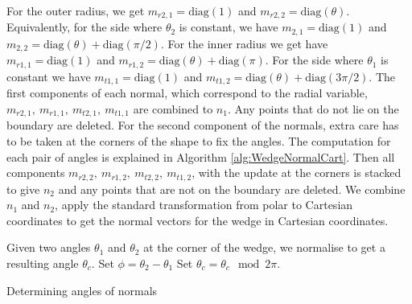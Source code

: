 \documentclass[11pt, a4paper]{article}
\theoremstyle{definition}
\begin{document}
For the outer radius, we get $m_{r2,1} = \text{diag}(1)$ and $m_{r2,2} = \text{diag} (\theta)$. Equivalently, for the side where $\theta_2$ is constant, we have $m_{2,1} = \text{diag}(1)$ and $m_{2,2} = \text{diag} (\theta) + \text{diag} (\pi/2)$. For the inner radius we get have $m_{r1,1} = \text{diag}(1)$ and $m_{r1,2} = \text{diag} (\theta) + \text{diag} (\pi)$. For the side where $\theta_1$ is constant we have $m_{t1,1} = \text{diag}(1)$ and $m_{t1,2} = \text{diag} (\theta) + \text{diag} (3\pi/2)$.
The first components of each normal, which correspond to the radial variable, $m_{r2,1}, \ m_{r1,1}, \ m_{t2,1}, \ m_{t1,1}$ are combined to $n_1$. Any points that do not lie on the boundary are deleted. 
For the second component of the normals, extra care has to be taken at the corners of the shape to fix the angles. The computation for each pair of angles is explained in Algorithm \ref{alg:WedgeNormalCart}.
Then all components $m_{r2,2}, \ m_{r1,2}, \ m_{t2,2}, \ m_{t1,2}$, with the update at the corners is stacked to give $n_2$ and any points that are not on the boundary are deleted.
We combine $n_1$ and $n_2$, apply the standard transformation from polar to Cartesian coordinates to get the normal vectors for the wedge in Cartesian coordinates.
\\
\begin{algorithm}[H]
	\SetAlgoLined
	Given two angles $\theta_1$ and $\theta_2$ at the corner of the wedge, we normalise to get a resulting angle $\theta_c$.
	Set $\phi = \theta_2 - \theta_1$
Set $ \theta_c = \theta_c \mod 2 \pi$.
	\caption{Determining angles of normals}
	\label{alg:WedgeNormalCart}
\end{algorithm}
\end{document}
